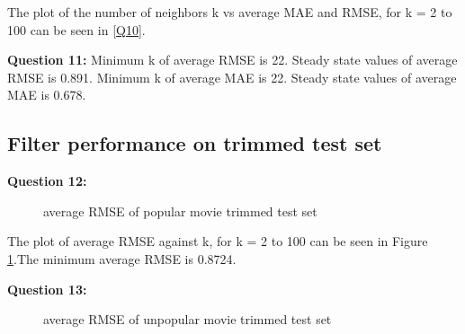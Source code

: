 \documentclass{article}
\begin{document}
The plot of the number of neighbors k vs average MAE and RMSE, for k = 2 to 100 can be seen in \ref{Q10}.
\newline

\bigbreak \textbf{Question 11:}
Minimum k of average RMSE is 22. Steady state values of average RMSE is 0.891. 
Minimum k of average MAE is 22. Steady state values of average MAE is 0.678. 


\subsection{Filter performance on trimmed test set}

\bigbreak \textbf{Question 12:}
\begin{figure}
\centering
{}
\caption{average RMSE of popular movie trimmed test set} \label{Q12}
\end{figure}

The plot of average RMSE against k, for k = 2 to 100 can be seen in Figure \ref{Q12}.The minimum average RMSE is 0.8724.
\newline


\bigbreak \textbf{Question 13:}
\begin{figure}
\centering
{}
\caption{average RMSE of unpopular movie trimmed test set} \label{Q13}
\end{figure}
\end{document}
